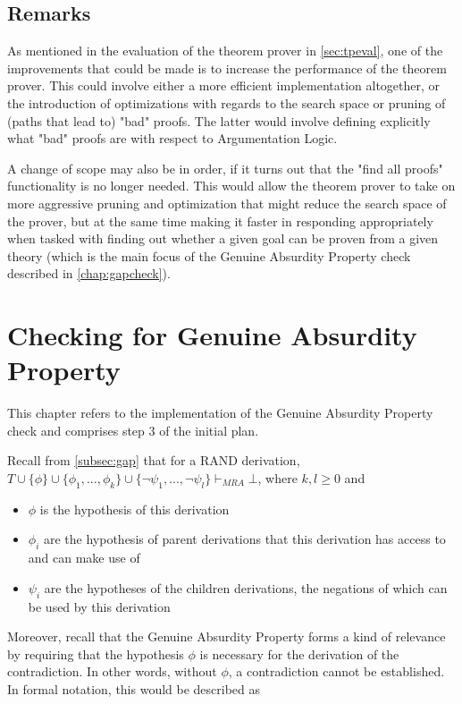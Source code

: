 \documentclass[11pt,twoside,a4paper]{report}
\begin{document}
\section{Remarks}
As mentioned in the evaluation of the theorem prover in \autoref{sec:tpeval}, one of the improvements that could be made is to increase the performance of the theorem prover. This could involve either a more efficient implementation altogether, or the introduction of optimizations with regards to the search space or pruning of (paths that lead to) "bad" proofs. The latter would involve defining explicitly what "bad" proofs are with respect to Argumentation Logic.

A change of scope may also be in order, if it turns out that the "find all proofs" functionality is no longer needed. This would allow the theorem prover to take on more aggressive pruning and optimization that might reduce the search space of the prover, but at the same time making it faster in responding appropriately when tasked with finding out whether a given goal can be proven from a given theory (which is the main focus of the Genuine Absurdity Property check described in \autoref{chap:gapcheck}).

\chapter{Checking for Genuine Absurdity Property}
\label{chap:gapcheck}

This chapter refers to the implementation of the Genuine Absurdity Property check and comprises step 3 of the initial plan.

Recall from \autoref{subsec:gap} that for a RAND derivation, $T\cup\{\phi\}\cup\{\phi_1, ..., \phi_k\}\cup\{\neg\psi_1, ..., \neg\psi_l\}\vdash_{MRA}\bot$, where $k, l \geq 0$ and

\begin{itemize}
\item
$\phi$ is the hypothesis of this derivation
\item
$\phi_i$ are the hypothesis of parent derivations that this derivation has access to and can make use of
\item
$\psi_i$ are the hypotheses of the children derivations, the negations of which can be used by this derivation
\end{itemize}

Moreover, recall that the Genuine Absurdity Property forms a kind of relevance by requiring that the hypothesis $\phi$ is necessary for the derivation of the contradiction. In other words, without $\phi$, a contradiction cannot be established. In formal notation, this would be described as
\end{document}
